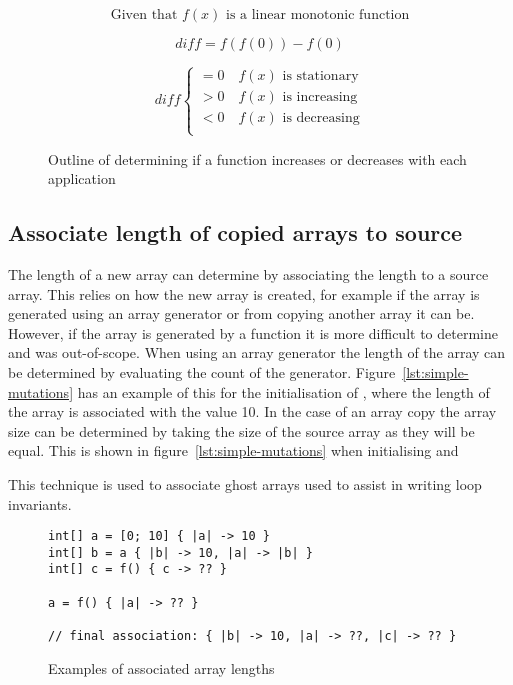 \begin{figure}
    $$\text{Given that } f(x) \text{ is a linear monotonic function}$$

    $$diff = f(f(0)) - f(0)$$

    \[
        diff \begin{cases}
            = 0 \quad f(x) \text{ is stationary}\\
            > 0 \quad f(x) \text{ is increasing}\\
            < 0 \quad f(x) \text{ is decreasing}\\
        \end{cases}
    \]
    \caption{Outline of determining if a function increases or decreases with
    each application}
\label{math:simple-mutation}
\end{figure}


\subsection{Associate length of copied arrays to source}\label{s:copied-array}

The length of a new array can determine by associating the length to a source
array.
This relies on how the new array is created, for example if the array is
generated using an array generator or from copying another array it can be.
However, if the array is generated by a function it is more difficult to
determine and was out-of-scope.
When using an array generator the length of the array can be determined by
evaluating the count of the generator.
Figure~\ref{lst:simple-mutations} has an example of this for the initialisation
of , where the length of the array is associated with the value 10.
In the case of an array copy the array size can be determined by taking the
size of the source array as they will be equal.
This is shown in figure~\ref{lst:simple-mutations} when initialising 
and 

This technique is used to associate ghost arrays used to assist in writing
loop invariants.

\begin{figure}[ht]
\begin{lstlisting}
int[] a = [0; 10] { |a| -> 10 }
int[] b = a { |b| -> 10, |a| -> |b| }
int[] c = f() { c -> ?? }

a = f() { |a| -> ?? }

// final association: { |b| -> 10, |a| -> ??, |c| -> ?? }
\end{lstlisting}
\caption{Examples of associated array lengths}
\label{lst:assoicated-arrays}
\end{figure}
